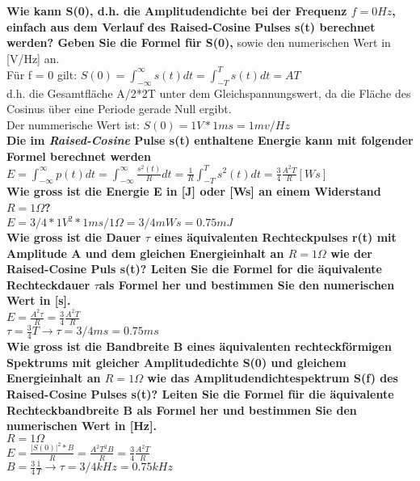 \textbf{Wie kann S(0), d.h. die Amplitudendichte bei der Frequenz $f=0 Hz$, einfach aus dem Verlauf des Raised-Cosine Pulses s(t) berechnet werden? Geben Sie die Formel für S(0),}
sowie den numerischen Wert in [V/Hz] an.\\
Für f = 0 gilt: $S(0)=\int_{-\infty}^{\infty}s(t)dt=\int_{-T}^{T}s(t)dt=AT$\\
d.h. die Gesamtfläche A/2*2T unter dem Gleichspannungswert, da die Fläche des Cosinus über eine Periode gerade Null ergibt.\\
Der nummerische Wert ist: $S(0)=1V*1ms=1mv/Hz$\\

\textbf{Die im \textit{Raised-Cosine} Pulse s(t) enthaltene Energie kann mit folgender Formel berechnet werden}\\
$E=\int_{-\infty}^{\infty}p(t)dt=\int_{-\infty}^{\infty}\frac{s^2(t)}{R}dt=\frac{1}{R}\int_{-T}^{T}s^2(t)dt=\frac{3}{4}\frac{A^2T}{R}[Ws]$\\

\textbf{Wie gross ist die Energie E in [J] oder [Ws] an einem Widerstand $R = 1 \Omega$?}\\
$E = 3/4 * 1 V^2 * 1ms / 1 \Omega  = 3/4 mWs = 0.75 mJ$\\

\textbf{Wie gross ist die Dauer $\tau $ eines äquivalenten Rechteckpulses r(t) mit Amplitude A und dem gleichen Energieinhalt an $R = 1 \Omega$ wie der Raised-Cosine Puls s(t)? Leiten Sie die Formel for die äquivalente Rechteckdauer $\tau $als Formel her und bestimmen Sie den numerischen Wert in [s].}\\
$E=\frac{A^2 \tau }{R}=\frac{3}{4}\frac{A^2T}{R}$\\
$\tau=\frac{3}{4}T \rightarrow \tau=3/4 ms = 0.75ms$\\

\textbf{Wie gross ist die Bandbreite B eines äquivalenten rechteckförmigen Spektrums mit gleicher Amplitudedichte S(0) und gleichem Energieinhalt an $R = 1 \Omega$ wie das Amplitudendichtespektrum S(f) des Raised-Cosine Pulses s(t)? Leiten Sie die Formel für die äquivalente Rechteckbandbreite B als Formel her und bestimmen Sie den numerischen Wert in [Hz].}\\
$R=1\Omega$\\
$E=\frac{|S(0)|^2*B}{R}=\frac{A^2T^2B}{R}=\frac{3}{4}\frac{A^2T}{R}$\\
$B=\frac{3}{4}\frac{1}{T} \rightarrow \tau = 3/4 kHz = 0.75 kHz$\\


